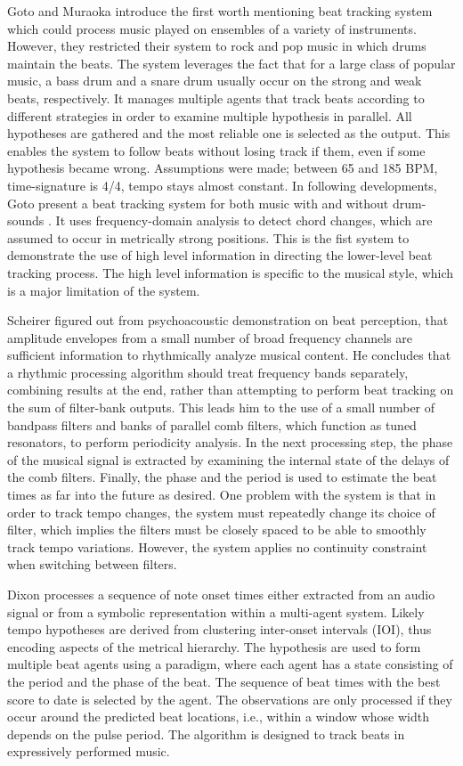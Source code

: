 \documentclass{scrartcl}
\begin{document}
Goto and Muraoka \cite{Goto1994} introduce the first worth mentioning beat tracking system which could process music played on ensembles of a variety of instruments. However, they restricted their system to rock and pop music in which drums maintain the beats. The system leverages the fact that for a large class of popular music, a bass drum and a snare drum usually occur on the strong and weak beats, respectively. It manages multiple agents that track beats according to different strategies in order to examine multiple hypothesis in parallel. All hypotheses are gathered and the most reliable one is selected as the output. This enables the system to follow beats without losing track if them, even if some hypothesis became wrong. Assumptions were made; between 65 and 185 BPM, time-signature is 4/4, tempo stays almost constant. In following developments, Goto present a beat tracking system for both music with and without drum-sounds \cite{Goto2001}. It uses frequency-domain analysis to detect chord changes, which are assumed to occur in metrically strong positions. This is the fist system to demonstrate the use of high level information in directing the lower-level beat tracking process. The high level information is specific to the musical style, which is a major limitation of the system.  

Scheirer \cite{Scheirer1998} figured out from psychoacoustic demonstration on beat perception, that amplitude envelopes from a small number of broad frequency channels are sufficient information to rhythmically analyze musical content. He concludes that a rhythmic processing algorithm should treat frequency bands separately, combining results at the end, rather than attempting to perform beat tracking on the sum of filter-bank outputs. This leads him to the use of a small number of bandpass filters and banks of parallel comb filters, which function as tuned resonators, to perform periodicity analysis. In the next processing step, the phase of the musical signal is extracted by examining the internal state of the delays of the comb filters. Finally, the phase and the period is used to estimate the beat times as far into the future as desired. One problem with the system is that in order to track tempo changes, the system must repeatedly change its choice of filter, which implies the filters must be closely spaced to be able to smoothly track tempo variations. However, the system applies no continuity constraint when switching between filters.  

Dixon \cite{Dixon2001} processes a sequence of note onset times either extracted from an audio signal or from a symbolic representation within a multi-agent system. Likely tempo hypotheses are derived from clustering inter-onset intervals (IOI), thus encoding aspects of the metrical hierarchy. The hypothesis are used to form multiple beat agents using a paradigm, where each agent has a state consisting of the period and the phase of the beat. The sequence of beat times with the best score to date is selected by the agent. The observations are only processed if they occur around the predicted beat locations, i.e., within a window whose width depends on the pulse period. The algorithm is designed to track beats in expressively performed music.
\end{document}
